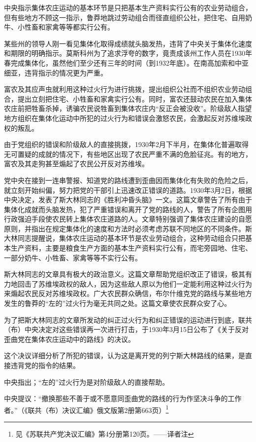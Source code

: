 中央指示集体农庄运动的基本环节是只把基本生产资料实行公有的农业劳动组合，但有些地方不顾这一指示，鲁莽地跳过劳动组合而径直组织公社，把住宅、自用奶牛、小性畜和家禽等等都实行公有。

某些州的领导人刚一看见集体化取得成绩就头脑发热，违背了中央关于集体化速度和期限的明确指示。莫斯科州为了追求浮夸的数字，竟责成该州工作人员在1930年春完成集体化，虽然他们至少还有三年的时间（到1932年底）。在南高加索和中亚细亚，违背指示的情况更为严重。

富农及其应声虫就利用这种过火行为进行挑拨，提出组织公社而不组织农业劳动组合，提出立刻把住宅、小牲畜和家禽实行公有。同时，富农还鼓动农民在加入集体农庄前把牲畜杀掉，诱骗农民说牲畜到集体农庄内“反正会被没收”。阶级敌人指望地方组织在集体化运动中所犯的过火行为和错误会激怒农民，会激起反对苏维埃政权的叛乱。

由于党组织的错误和阶级敌人的直接挑拨，1930年2月下半月，在集体化普遍取得无可置疑的成就的情况下，有些地区出现了农民严重不满的危脸征兆。有的地方，富农及其走狗甚至煽起了农民公开反对苏维埃。

党中央在接到一连串警报、知道党的路线遭到歪曲因而集体化有失败的危险之后，就立刻开始纠偏，努力把党的干部引上迅速改正错误的道路。1930年3月2日，根据中央决定，发表了斯大林同志的《胜利冲昏头脑》一文。这篇文章警告了所有由于集体化成就而头脑发热，犯了严重错误和离开了党的路线的人，警告了所有企图用行政强迫手段使农民转上集体农庄道路的人。文章特别强调了集体农庄建设的自愿原则，并指出在规定集体化的速度和方法时必须考虑苏联不同地区的不同条件。斯大林同志提醒说，集体农庄运动的基本环节是农业劳动组合，这种劳动组合只把基本生产资料，主要是粮食生产方面的基本生产资料实行公有，而宅旁园地、住宅、一部分奶牛、小牲畜、家禽等等不实行公有。

斯大林同志的文章具有极大的政治意义。这篇文章帮助党组织改正了错误，极其有力地回击了苏维埃政权的敌人，因为这些敌人原以为他们一定能利用这种过火行为来煽起农民反对苏维埃政权。广大农民群众确信，布尔什维克党的路线与某些地方发生的鲁莽的“左的”过火行为毫无共同之处。这篇文章使农民群众安了心。

为了把斯大林同志的文章所发动的纠正过火行为和纠正错误的运动进行到底，联共（布）中央决定对这些错误再一次进行打击，于1930年3月15日公布了《关于反对歪曲党在集体农庄运动中的路线》的决议。

这个决议详细分析了所犯的错误，认为这是离开党的列宁斯大林路线的结果，是直接违背党的指令的结果。

中央指出；“左的”过火行为是对阶级敌人的直接帮助。

中央提议：“撤换那些不善于或不愿意同歪曲党的路线的行为作坚决斗争的工作者。”（《联共（布）决议汇编》俄文版第2册第663页）\footnote{见《苏联共产党决议汇编》第4分册第120页。——译者注}

